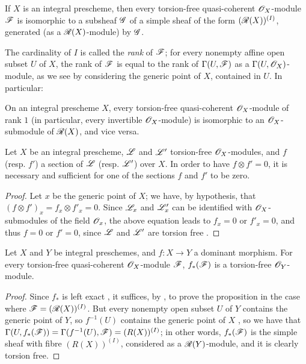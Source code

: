 \begin{proposition}[7.4.2]
\label{I.7.4.2}
If $X$ is an integral prescheme, then every torsion-free quasi-coherent $\mathscr{O}_X$-module $\mathscr{F}$ is isomorphic to a subsheaf $\mathscr{G}$ of a simple sheaf of the form $(\mathscr{R}(X))^{(I)}$, generated (as a $\mathscr{R}(X)$-module) by $\mathscr{G}$.
\end{proposition}

The cardinality of $I$ is called the \emph{rank} of $\mathscr{F}$; for every nonempty affine open subset $U$ of $X$, the rank of $\mathscr{F}$ is equal to the rank of $\Gamma(U,\mathscr{F})$ as a $\Gamma(U,\mathscr{O}_X)$-module, as we see by considering the generic point of $X$, contained in $U$.
In particular:
\begin{corollary}[7.4.3]
\label{I.7.4.3}
On an integral prescheme $X$, every torsion-free quasi-coherent $\mathscr{O}_X$-module of rank $1$ (in particular, every invertible $\mathscr{O}_X$-module) is isomorphic to an $\mathscr{O}_X$-submodule of $\mathscr{R}(X)$, and vice versa.
\end{corollary}

\begin{corollary}[7.4.4]
\label{I.7.4.4}
Let $X$ be an integral prescheme, $\mathscr{L}$ and $\mathscr{L}'$ torsion-free $\mathscr{O}_X$-modules, and $f$ (resp. $f'$) a section of $\mathscr{L}$ (resp. $\mathscr{L}'$) over $X$.
In order to have $f\otimes f'=0$, it is necessary and sufficient for one of the sections $f$ and $f'$ to be zero.
\end{corollary}

\begin{proof}
Let $x$ be the generic point of $X$; we have, by hypothesis, that $(f\otimes f')_x=f_x\otimes f'_x=0$.
Since $\mathscr{L}_x$ and $\mathscr{L}'_x$ can be identified with $\mathscr{O}_X$-submodules of the field $\mathscr{O}_x$, the above equation leads to $f_x=0$ or $f'_x=0$, and thus $f=0$ or $f'=0$, since $\mathscr{L}$ and $\mathscr{L}'$ are torsion free .
\end{proof}

\begin{proposition}[7.4.5]
\label{I.7.4.5}
Let $X$ and $Y$ be integral preschemes, and $f:X\to Y$ a dominant morphism.
For every torsion-free quasi-coherent $\mathscr{O}_X$-module $\mathscr{F}$, $f_*(\mathscr{F})$ is a torsion-free $\mathscr{O}_Y$-module.
\end{proposition}

\begin{proof}
Since
$f_*$ is left exact , it suffices, by , to prove the proposition in the case where $\mathscr{F}=(\mathscr{R}(X))^{(I)}$.
But every nonempty open subset $U$ of $Y$ contains the generic point of $Y$, so $f^{-1}(U)$ contains the generic point of $X$ , so we have that $\Gamma(U,f_*(\mathscr{F}))=\Gamma(f^{-1}(U),\mathscr{F})=(R(X))^{(I)}$; in other words, $f_*(\mathscr{F})$ is the simple sheaf with fibre $(R(X))^{(I)}$, considered as a $\mathscr{R}(Y)$-module, and it is clearly torsion free.
\end{proof}

